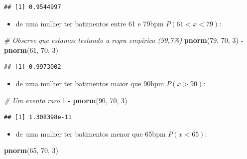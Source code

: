 \documentclass[
]{book}
\newenvironment{Shaded}{\begin{snugshade}}{\end{snugshade}}
\newcommand{\CommentTok}[1]{\textcolor[rgb]{0.56,0.35,0.01}{\textit{#1}}}
\newcommand{\DecValTok}[1]{\textcolor[rgb]{0.00,0.00,0.81}{#1}}
\newcommand{\FunctionTok}[1]{\textcolor[rgb]{0.13,0.29,0.53}{\textbf{#1}}}
\newcommand{\NormalTok}[1]{#1}
\newcommand{\SpecialCharTok}[1]{\textcolor[rgb]{0.81,0.36,0.00}{\textbf{#1}}}
\providecommand{\tightlist}{%
  \setlength{\itemsep}{0pt}\setlength{\parskip}{0pt}}
\begin{document}
\begin{verbatim}
## [1] 0.9544997
\end{verbatim}

\begin{itemize}
\tightlist
\item
  de uma mulher ter batimentos entre 61 e 79bpm \(P(61 < x < 79)\):
\end{itemize}

\begin{Shaded}
\begin{Highlighting}[]
\CommentTok{\# Observe que estamos testando a regra empírica (99,7\%)}
\FunctionTok{pnorm}\NormalTok{(}\DecValTok{79}\NormalTok{, }\DecValTok{70}\NormalTok{, }\DecValTok{3}\NormalTok{) }\SpecialCharTok{{-}} \FunctionTok{pnorm}\NormalTok{(}\DecValTok{61}\NormalTok{, }\DecValTok{70}\NormalTok{, }\DecValTok{3}\NormalTok{)}
\end{Highlighting}
\end{Shaded}

\begin{verbatim}
## [1] 0.9973002
\end{verbatim}

\begin{itemize}
\tightlist
\item
  de uma mulher ter batimentos maior que 90bpm \(P(x > 90)\):
\end{itemize}

\begin{Shaded}
\begin{Highlighting}[]
\CommentTok{\# Um evento raro}
\DecValTok{1} \SpecialCharTok{{-}} \FunctionTok{pnorm}\NormalTok{(}\DecValTok{90}\NormalTok{, }\DecValTok{70}\NormalTok{, }\DecValTok{3}\NormalTok{)}
\end{Highlighting}
\end{Shaded}

\begin{verbatim}
## [1] 1.308398e-11
\end{verbatim}

\begin{itemize}
\tightlist
\item
  de uma mulher ter batimentos menor que 65bpm \(P(x < 65)\):
\end{itemize}

\begin{Shaded}
\begin{Highlighting}[]
\FunctionTok{pnorm}\NormalTok{(}\DecValTok{65}\NormalTok{, }\DecValTok{70}\NormalTok{, }\DecValTok{3}\NormalTok{)}
\end{Highlighting}
\end{Shaded}
\end{document}
